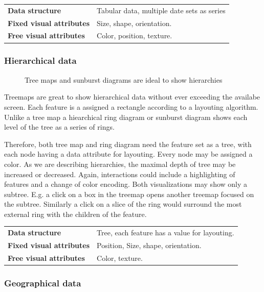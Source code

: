 \documentclass{article}
\newcommand{\conceptTable}[3]{%
    \begin{center}
    {\small
        \begin{tabulary}{\textwidth}{ll}
            \bf Data structure & #1 \\

            \bf Fixed visual attributes & #2 \\

            \bf Free visual attributes & #3  \\
        \end{tabulary}
    }
    \end{center}
}
\begin{document}
\conceptTable{Tabular data, multiple date sets as series}{Size, shape, orientation.}{Color, position, texture.}

\subsubsection{Hierarchical data}

\begin{figure}
  \centering
    \qquad
    \caption{Tree maps and sunburst diagrams are ideal to show hierarchies}%
    \label{fig:concept:chart-types:hierarchies}
\end{figure}

Treemaps are great to show hierarchical data without ever exceeding the availabe screen.
Each feature is a assigned a rectangle according to a layouting algorithm.
Unlike a tree map a hiearchical ring diagram or sunburst diagram shows each level of the tree as a series of rings.

Therefore, both tree map and ring diagram need the feature set as a tree, with each node having a data attribute for layouting. Every node may be assigned a color.
As we are describing hierarchies, the maximal depth of tree may be increased or decreased. 
Again, interactions could include a highlighting of features and a change of color encoding.
Both visualizations may show only a subtree.
E.g. a click on a box in the treemap opens another treemap focused on the subtree.
Similarly a click on a slice of the ring would surround the most external ring with the children of the feature.

\conceptTable{Tree, each feature has a value for layouting.}{Position, Size, shape, orientation.}{Color, texture.}

\subsubsection{Geographical data}
\end{document}
